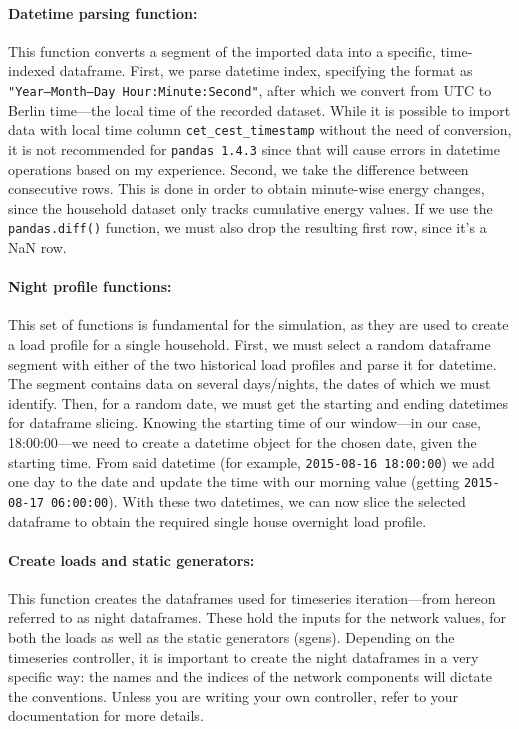\documentclass[a4paper,10pt]{report}
\begin{document}
\paragraph{Datetime parsing function:} This function converts a segment of the imported data into a specific, time-indexed dataframe. First, we parse datetime index, specifying the format as \texttt{"Year--Month--Day Hour:Minute:Second"}, after which we convert from UTC to Berlin time---the local time of the recorded dataset. While it is possible to import data with local time column \texttt{cet\_cest\_timestamp} without the need of conversion, it is not recommended for \texttt{pandas 1.4.3} since that will cause errors in datetime operations based on my experience. Second, we take the difference between consecutive rows. This is done in order to obtain minute-wise energy changes, since the household dataset only tracks cumulative energy values. If we use the \texttt{pandas.diff()} function, we must also drop the resulting first row, since it's a NaN row.

\paragraph{Night profile functions:} This set of functions is fundamental for the simulation, as they are used to create a load profile for a single household. First, we must select a random dataframe segment with either of the two historical load profiles and parse it for datetime. The segment contains data on several days/nights, the dates of which we must identify. Then, for a random date, we must get the starting and ending datetimes for dataframe slicing. Knowing the starting time of our window---in our case, 18:00:00---we need to create a datetime object for the chosen date, given the starting time. From said datetime (for example, \texttt{2015-08-16 18:00:00}) we add one day to the date and update the time with our morning value (getting \texttt{2015-08-17 06:00:00}). With these two datetimes, we can now slice the selected dataframe to obtain the required single house overnight load profile.

\paragraph{Create loads and static generators:} This function creates the dataframes used for timeseries iteration---from hereon referred to as night dataframes. These hold the inputs for the network values, for both the loads as well as the static generators (sgens). Depending on the timeseries controller, it is important to create the night dataframes in a very specific way: the names and the indices of the network components will dictate the conventions. Unless you are writing your own controller, refer to your documentation for more details.
\end{document}
